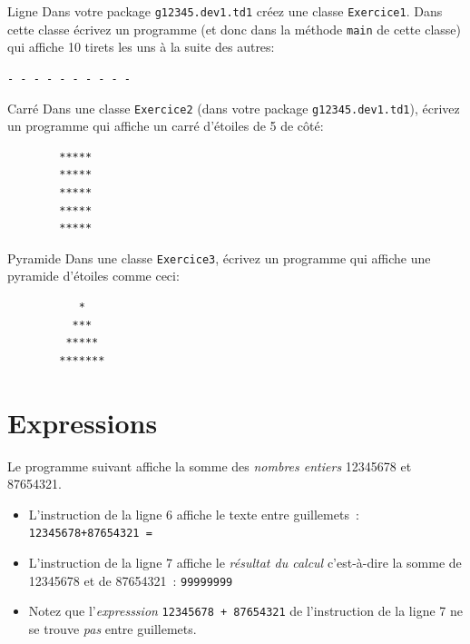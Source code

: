 \documentclass[a4paper,11pt]{style-esi/td}
\begin{document}
\begin{Exercice}{Ligne}
	Dans votre package \texttt{g12345.dev1.td1} créez une classe \texttt{Exercice1}.
	Dans cette classe écrivez un programme  (et donc dans la méthode \texttt{main} de cette classe)
	qui affiche 10 tirets les uns à la suite des autres:

	\texttt{- - - - - - - - - -}
\end{Exercice}

\begin{Exercice}{Carré}
	Dans une classe \texttt{Exercice2} (dans votre package \texttt{g12345.dev1.td1}), écrivez un programme qui affiche un carré d'étoiles de 5 de côté:

	\begin{verbatim}
		*****
		*****
		*****
		*****
		*****
		\end{verbatim}
\end{Exercice}

\begin{Exercice}{Pyramide}
	Dans une classe \texttt{Exercice3}, écrivez un programme qui affiche une pyramide d'étoiles comme ceci:

	\begin{verbatim}
		   *
		  ***
		 *****
		*******
		\end{verbatim}
\end{Exercice}



\section{Expressions}

Le programme suivant affiche la somme des \emph{nombres entiers}  12345678 et 87654321.


\begin{itemize}
	\item	L'instruction de la ligne 6 affiche le texte entre guillemets~: \texttt{12345678+87654321 = }

	\item L'instruction de la ligne 7 affiche le \emph{résultat du calcul}
	      c'est-à-dire la somme de 12345678 et de 87654321~:  \texttt{99999999}

	\item Notez que l'\emph{expresssion} \texttt{12345678 + 87654321}
	      de l'instruction de la ligne 7 ne se trouve \emph{pas} entre guillemets.
\end{itemize}
\end{document}
